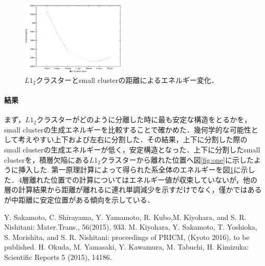 \documentclass[12pt, a4paper]{jarticle}
\newcommand{\講演番号}
{14pPSA-18}
\newcommand{\講演題目}
{Mg-LPSOのL\mbox{\boldmath $1_2$} クラスターの第一原理計算}
\newcommand{\英文題目}
{First principle calculations of L1$_2$ Cluster in Mg-Zn-Y alloy}
\newcommand{\和文所属}
{関西学院大・理工}
\newcommand{\和文氏名}
{西谷滋人, 清原資之, 森下慎也}
\newcommand{\英文所属}
{Department of Informatics, Kwansei Gakuin Univ}
\newcommand{\英文氏名}
{S. R. Nishitani, M. Kiyohara, and S. Morishita}
\newlength\題目幅
\newlength\ヘッダ項目間隔
\newlength\所属インデント
\newlength\和文氏名インデント
\newlength\英文氏名インデント
\newlength\最小所属氏名間隔
\newlength\ヘッダ行間隔
\newlength\本文行間隔
\newlength\上端余白
\newlength\左端余白
\begin{document}
\begin{figure}
\vspace{\baselineskip}
\begin{center}
   \includegraphics[width=50mm]{./small_cluster3.eps}
  \caption{$L1_2$クラスターとsmall clusterの距離によるエネルギー変化．}
  \label{fig:two}
\end{center}
\vspace{-2\baselineskip}
\end{figure}
\vspace{-1\baselineskip}
\paragraph{結果}
まず，$L1_2$クラスターがどのように分離した時に最も安定な構造をとるかを，small clusterの生成エネルギーを比較することで確かめた．幾何学的な可能性として考えやすい上下および左右に分割した．その結果，上下に分割した際のsmall clusterの生成エネルギーが低く，安定構造となった．上下に分割したsmall clusterを，積層欠陥にある$L1_2$クラスターから離れた位置へ図\ref{fig:one}に示したように挿入した. 第一原理計算によって得られた系全体のエネルギーを図\ref{fig:two}に示した．4層離れた位置での計算についてはエネルギー値が収束していないが，他の層の計算結果から距離が離れるに連れ単調減少を示すだけでなく，僅かではあるが中距離に安定位置がある傾向を示している．

{\small\setlength\baselineskip{10pt}	%
\begin{thebibliography}{9}
Y. Sakamoto, C. Shirayama, Y. Yamamoto, R. Kubo,M. Kiyohara, and S. R. Nishitani: Mater.Trans., 56(2015), 933.
 M. Kiyohara, Y. Sakamoto, T. Yoshioka, S. Morishita, and S. R. Nishitani: proceedings of PRICM, (Kyoto 2016), to be published.
H. Okuda, M. Yamasaki, Y. Kawamura, M. Tabuchi, H. Kimizuka: Scientific Reports 5 (2015), 14186.
\end{thebibliography}
}
\end{document}
